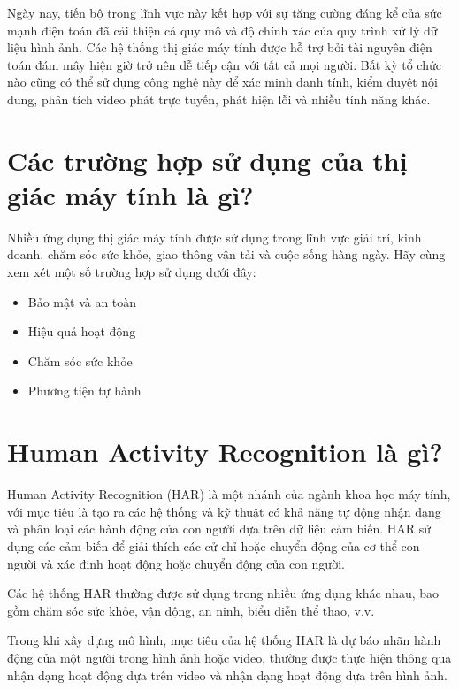 Ngày nay, tiến bộ trong lĩnh vực này kết hợp với sự tăng cường đáng kể của sức mạnh điện toán đã cải thiện cả quy mô và độ chính xác của quy trình xử lý dữ liệu hình ảnh. Các hệ thống thị giác máy tính được hỗ trợ bởi tài nguyên điện toán đám mây hiện giờ trở nên dễ tiếp cận với tất cả mọi người. Bất kỳ tổ chức nào cũng có thể sử dụng công nghệ này để xác minh danh tính, kiểm duyệt nội dung, phân tích video phát trực tuyến, phát hiện lỗi và nhiều tính năng khác.

\section{Các trường hợp sử dụng của thị giác máy tính là gì?}
Nhiều ứng dụng thị giác máy tính được sử dụng trong lĩnh vực giải trí, kinh doanh, chăm sóc sức khỏe, giao thông vận tải và cuộc sống hàng ngày. Hãy cùng xem xét một số trường hợp sử dụng dưới đây:
\begin{itemize}
	\item Bảo mật và an toàn
	
	\item Hiệu quả hoạt động

	
	\item Chăm sóc sức khỏe
 
        \item Phương tiện tự hành
        

\end{itemize}

\section{Human Activity Recognition là gì? }

Human Activity Recognition (HAR) là một nhánh của ngành khoa học máy tính, với mục tiêu là tạo ra các hệ thống và kỹ thuật có khả năng tự động nhận dạng và phân loại các hành động của con người dựa trên dữ liệu cảm biến. HAR sử dụng các cảm biến để giải thích các cử chỉ hoặc chuyển động của cơ thể con người và xác định hoạt động hoặc chuyển động của con người.

Các hệ thống HAR thường được sử dụng trong nhiều ứng dụng khác nhau, bao gồm chăm sóc sức khỏe, vận động, an ninh, biểu diễn thể thao, v.v.

Trong khi xây dựng mô hình, mục tiêu của hệ thống HAR là dự báo nhãn hành động của một người trong hình ảnh hoặc video, thường được thực hiện thông qua nhận dạng hoạt động dựa trên video và nhận dạng hoạt động dựa trên hình ảnh.
\newpage

